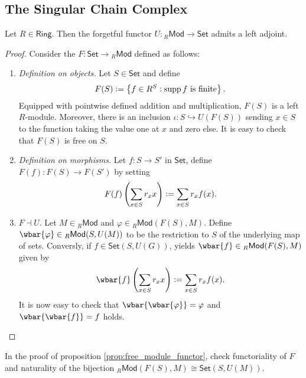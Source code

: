 \subsection*{The Singular Chain Complex}

\begin{proposition}
	\label{prop:free_module_functor}
	Let $R \in \mathsf{Ring}$. Then the forgetful functor $U : {_R}\mathsf{Mod} \to \mathsf{Set}$ admits a left adjoint.
\end{proposition}

\begin{proof}
	Consider the  $F: \mathsf{Set} \to {_R}\mathsf{Mod}$ defined as follows:
	\begin{enumerate}[label = \textit{Step \arabic*:},wide = 0pt]
		\item \textit{Definition on objects.} Let $S \in \mathsf{Set}$ and define 
			\begin{equation*}
				F(S) := \cbr[1]{f \in R^S : \supp f \text{ is finite}}.
			\end{equation*}
			Equipped with pointwise defined addition and multiplication, $F(S)$ is a left $R$-module. Moreover, there is an inclusion $\iota : S \hookrightarrow U(F(S))$ sending $x \in S$ to the function taking the value one at $x$ and zero else. It is easy to check that $F(S)$ is free on $S$.
		\item \textit{Definition on morphisms.} Let $f : S \to S'$ in $\mathsf{Set}$, define $F(f) : F(S) \to F(S')$ by setting 
			\begin{equation*}
				F(f)\del[4]{\sum_{x \in S}r_x x} := \sum_{x \in S}r_x f(x).
			\end{equation*}
		\item $F \dashv U$. Let $M \in {_R}\mathsf{Mod}$ and $\varphi \in {_R}\mathsf{Mod}(F(S), M)$. Define $\wbar{\varphi} \in {_R}\mathsf{Mod}(S,U(M))$ to be the restriction to $S$ of the underlying map of sets. Conversly, if $f \in \mathsf{Set}(S,U(G))$,  yields $\wbar{f} \in {_R}\mathsf{Mod}(F(S),M)$ given by
		\begin{equation*}
			\wbar{f}\del[4]{\sum_{x \in S} r_x x} := \sum_{x \in S} r_x f(x).
		\end{equation*}
		It is now easy to check that $\wbar{\wbar{\varphi}} = \varphi$ and $\wbar{\wbar{f}} = f$ holds. 
	\end{enumerate}	
\end{proof}

\begin{exercise}
	In the proof of proposition \ref{prop:free_module_functor}, check functoriality of $F$ and naturality of the bijection ${_R}\mathsf{Mod}(F(S),M) \cong \mathsf{Set}(S,U(M))$.
\end{exercise}

